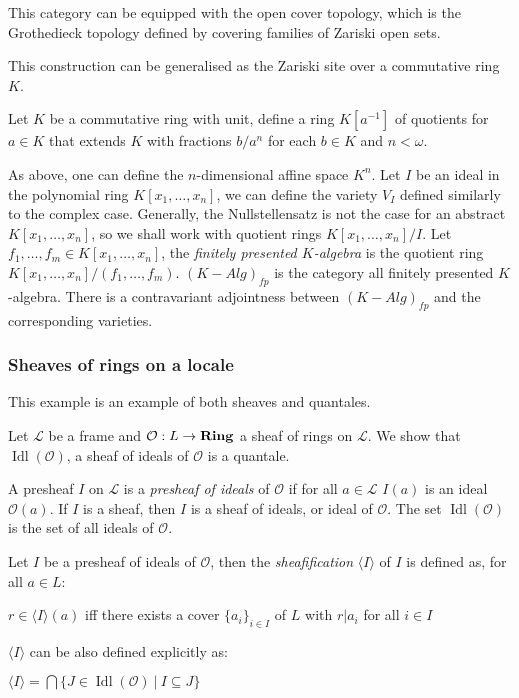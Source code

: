 \documentclass[a4paper]{article}
\theoremstyle{defin}
\theoremstyle{theorem}
\theoremstyle{claim}
\theoremstyle{prop}
\theoremstyle{lemma}
\theoremstyle{fact}
\theoremstyle{ex}
\theoremstyle{col}
\begin{document}
This category can be equipped with the open cover topology, which is the Grothedieck topology defined by covering families of Zariski open sets.

This construction can be generalised as the Zariski site over a commutative ring $K$.

Let $K$ be a commutative ring with unit, define a ring $K[a^{-1}]$ of quotients for $a \in K$ that extends $K$ with fractions $b/a^n$ for each $b \in K$ and $n < \omega$.

As above, one can define the $n$-dimensional affine space $K^n$. Let $I$ be an ideal in the polynomial ring $K[x_1, \dots, x_n]$, we can define the variety $V_I$ defined similarly to the complex case. Generally, the Nullstellensatz is not the case for an abstract $K[x_1, \dots, x_n]$, so we shall work with quotient rings $K[x_1, \dots, x_n]/I$. Let $f_1, \dots, f_m \in K[x_1, \dots, x_n]$, the \emph{finitely presented $K$-algebra} is the quotient ring $K[x_1, \dots, x_n]/(f_1, \dots, f_m)$. $(K - Alg)_{fp}$ is the category all finitely presented $K$-algebra. There is a contravariant adjointness between $(K - Alg)_{fp}$ and the corresponding varieties.

\subsubsection{Sheaves of rings on a locale}

This example is an example of both sheaves and quantales.

Let $\mathcal{L}$ be a frame and $\mathcal{O} : L \to {\bf Ring}$ a sheaf of rings on $\mathcal{L}$. We show that $\operatorname{Idl}(\mathcal{O})$, a sheaf of ideals of $\mathcal{O}$ is a quantale.

A presheaf $I$ on $\mathcal{L}$ is a \emph{presheaf of ideals} of $\mathcal{O}$ if for all $a \in \mathcal{L}$
$I(a)$ is an ideal $\mathcal{O}(a)$. If $I$ is a sheaf, then $I$ is a sheaf of ideals, or ideal of $\mathcal{O}$. The set $\operatorname{Idl}(\mathcal{O})$ is the set of all ideals of $\mathcal{O}$.

Let $I$ be a presheaf of ideals of $\mathcal{O}$, then the \emph{sheafification} $\langle I \rangle$ of $I$ is defined as, for all $a \in L$:
\begin{center}
$r \in \langle I \rangle(a)$ iff there exists a cover $\{ a_i \}_{i \in I}$ of $L$ with $r|a_i$ for all $i \in I$
\end{center}

$\langle I \rangle$ can be also defined explicitly as:
\begin{center}
$\langle I \rangle = \bigcap \{ J \in \operatorname{Idl}(\mathcal{O}) \: | \: I \subseteq J \}$
\end{center}
\end{document}
